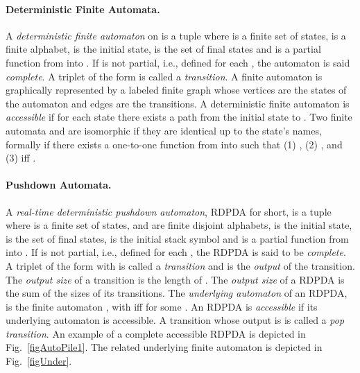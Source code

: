 \paragraph{Deterministic Finite Automata.}
A {\it deterministic finite automaton} on  is a tuple
 where  is a finite set of states,
 is a finite alphabet,  is the initial state,
 is the set of final states and  is a partial function
from  into . If  is not partial, i.e., defined for
each , the automaton is said {\it complete}. A
triplet of the form  is called a {\it transition}. A
finite automaton is graphically represented by a labeled finite graph whose
vertices are the states of the automaton and edges are the transitions. A
deterministic finite automaton is {\it accessible} if for each state 
there exists a path from the initial state to . Two finite automata
 and  are isomorphic if they are identical up to the state's names,
formally if there exists a one-to-one function  from  into
 such that (1) ,  (2)
, and (3)  iff
.

\paragraph{Pushdown Automata.}
A {\it real-time deterministic pushdown automaton}, RDPDA for short, is a
tuple  where  is a
finite set of states,  and  are finite disjoint alphabets,
 is the initial state,  is the set of final
states,  is the initial stack symbol and  is a partial
function from  into . If
 is not partial, i.e., defined for each , the
RDPDA is said to be {\it complete}. 
A triplet of the form  with
 is called a {\it transition} and  is the {\it
output} of the transition. The {\it output size} of a transition
 is the length of .  The {\it output size} of
a RDPDA is the sum of the sizes of its transitions.
The {\it underlying automaton} of an
RDPDA, is the finite automaton , with  iff 
for some . An RDPDA is {\it accessible} if its underlying
automaton is accessible. A transition whose output is  is
called a {\it pop transition}. An example of a complete accessible RDPDA is
depicted in Fig.~\ref{figAutoPile1}. The related underlying  finite
automaton is depicted in Fig.~\ref{figUnder}.


